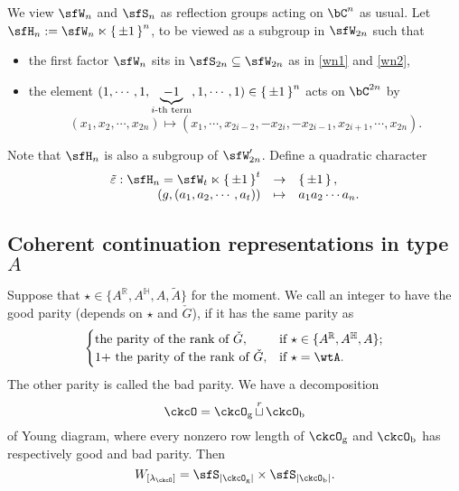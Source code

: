 \documentclass[12pt,a4paper]{amsart}
\def\subset{\subseteq}
\def\abs#1{\left|{#1}\right|}
\newcommand{\BH}{{\mathbb {H}}}
\newcommand{\R}{\mathbb R}
\numberwithin{equation}{section}
\theoremstyle{remark}
\def\lamck{\lambda_\ckcO}
\def\cuprow{{\stackrel{r}{\sqcup}}}
\def\cuprow{{\,\stackrel{r}{\sqcup}\,}}
\begin{document}
We view $\sfW_{n}$ and
$\sfS_{n}$ as reflection groups acting on $\bC^{n}$ as usual. Let
$\sfH_{n} := \sfW_n\ltimes \set{\pm 1}^n$, to be viewed as a  subgroup in $\sfW_{2n}$ such
that
\begin{itemize}
  \item the first factor $\sfW_{n}$ sits in $\sfS_{2n}\subset \sfW_{2n}$ as in \eqref{wn1} and \eqref{wn2},
    \item the element $(1,\cdots,1, \underbrace{-1}_{i\text{-th
        term}}, 1, \cdots, 1)\in \set{\pm 1}^{n}$ acts on $\bC^{2n}$ by
        \[
        (x_{1},x_{2},\cdots, x_{2n} ) \mapsto (x_{1},\cdots, x_{2i-2}, -x_{2i},-x_{2i-1},x_{2i+1},\cdots, x_{2n}).
        \]
\end{itemize}
Note that $\sfH_{n}$ is also a subgroup of $\sfW'_{2n}$. Define a quadratic
character
\[
  \begin{array}{rcl}
    \tilde{\varepsilon} :  \sfH_{n}=  \sfW_{t}\ltimes \set{\pm 1}^{t}& \rightarrow & \set{\pm 1},\\
                                  (g,(a_{1},a_{2},\cdots, a_{t})) & \mapsto & a_{1}a_{2}\cdots a_{n}.
  \end{array}
\]


\subsection{Coherent continuation representations in type $A$}



Suppose that $\star\in  \{A^\R, A^\BH, A, \widetilde A\}$ for the moment.
We call an integer to have the good parity (depends on $\star$ and $\check G$), if it has the same parity as
\[
  \begin{cases}
    \text{the parity of the rank of $\check G$}, &  \text{if $\star \in \{A^\R, A^\BH,  A\}$}; \\
    \text{1+ the parity of the rank of $\check G$}, &  \text{if $\star = \wtA$}. \\
  \end{cases}
\]
The other parity is called the bad parity.
We have a  decomposition
\[
\ckcO = \ckcO_{\mathrm g}\cuprow \ckcO_{\mathrm b}
\]
of  Young diagram, where every nonzero row length of $\ckcO_{\mathrm g}$  and $\ckcO_{\mathrm b}$ has respectively good and bad parity.
Then
\[
    W_{[\lamck]}  = \sfS_{\abs{\ckcO_{\mathrm g}}}\times \sfS_{\abs{\ckcO_{\mathrm b}}}.
    \]
\end{document}
